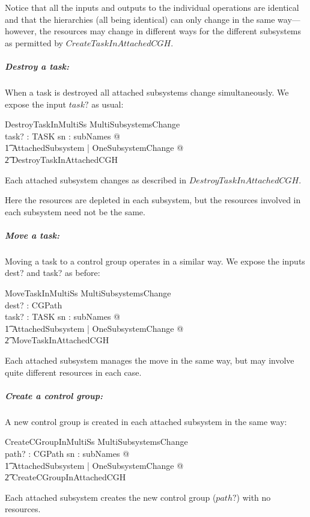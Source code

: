 \documentclass[a4paper,twoside,12pt]{article}
\begin{document}
Notice that all the inputs and outputs to the individual operations are identical and that the hierarchies (all being identical)
can only change in the same way---however, the resources may change in different ways for the different subsystems as permitted by
$CreateTaskInAttachedCGH$.

\subparagraph{Destroy a task:}

When a task is destroyed all attached subsystems change simultaneously. We expose the input $task?$ as usual:
\begin{schema}{DestroyTaskInMultiSs}
MultiSubsystemsChange \\
task? : TASK
\where
\forall sn : subNames @ \\
\t1 \exists \Delta AttachedSubsystem | OneSubsystemChange @ \\
    \t2 DestroyTaskInAttachedCGH
\end{schema}
Each attached subsystem changes as described in $DestroyTaskInAttachedCGH$.

Here the resources are depleted in each subsystem, but the resources involved in each subsystem need not be the same.

\subparagraph{Move a task:}

Moving a task to a control group operates in a similar way.  We expose the inputs dest? and task? as before:
\begin{schema}{MoveTaskInMultiSs}
MultiSubsystemsChange \\
dest? : CGPath \\
task? : TASK
\where
\forall sn : subNames @ \\
\t1 \exists \Delta AttachedSubsystem | OneSubsystemChange @ \\
    \t2 MoveTaskInAttachedCGH
\end{schema}
Each attached subsystem manages the move in the same way, but may involve quite different resources in each case.

\subparagraph{Create a control group:}

A new control group is created in each attached subsystem in the same way:

\begin{schema}{CreateCGroupInMultiSs}
MultiSubsystemsChange \\
path? : CGPath
\where
\forall sn : subNames @ \\
\t1 \exists \Delta AttachedSubsystem | OneSubsystemChange @ \\
    \t2 CreateCGroupInAttachedCGH
\end{schema}
Each attached subsystem creates the new control group ($path?$) with no resources.
\end{document}
